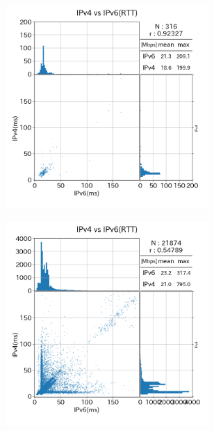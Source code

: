 \begin{figure}
\begin{center}
\begin{minipage}[t]{0.48\textwidth}
\begin{subfigure}[b]{\textwidth}
                \label{old_mix_rtt}
            \end{subfigure}
            \begin{subfigure}[b]{\textwidth}
                \centering
                \includegraphics[width=0.85\textwidth]{fig/old_PPPoE_rtt.png}
                \label{old_PPPoE_rtt}
            \end{subfigure}
            \caption{{\bf 期間(1)}におけるRTT}
            \label{fig:old_connect_rtt}
        \end{minipage}
        \hfill
        \begin{minipage}[t]{0.48\textwidth}
            \begin{subfigure}[b]{\textwidth}
                \centering
                \includegraphics[width=0.85\textwidth]{fig/new_IPv4aaS_rtt.png}

\end{subfigure}
\end{minipage}
\end{center}
\end{figure}

